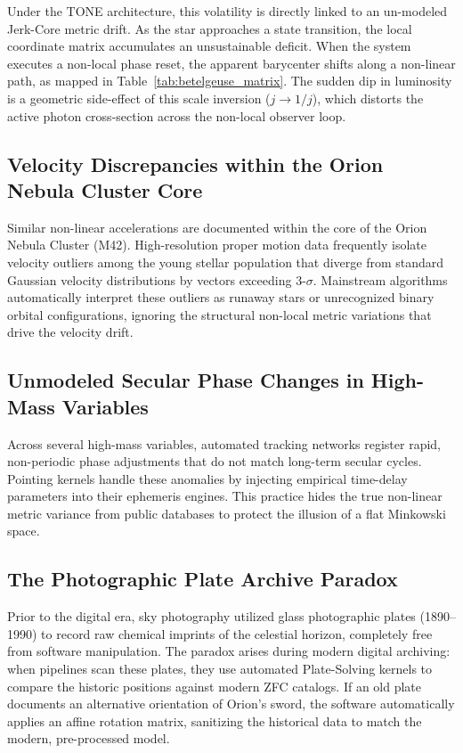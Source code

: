 \documentclass[11pt,a4paper]{article}
\theoremstyle{plain}
\theoremstyle{definition}
\begin{document}
Under the TONE architecture, this volatility is directly linked to an un-modeled Jerk-Core metric drift. As the star approaches a state transition, the local coordinate matrix accumulates an unsustainable deficit. When the system executes a non-local phase reset, the apparent barycenter shifts along a non-linear path, as mapped in Table~\ref{tab:betelgeuse_matrix}. The sudden dip in luminosity is a geometric side-effect of this scale inversion ($j \to 1/j$), which distorts the active photon cross-section across the non-local observer loop.
\subsection{Velocity Discrepancies within the Orion Nebula Cluster Core}
Similar non-linear accelerations are documented within the core of the Orion Nebula Cluster (M42). High-resolution proper motion data frequently isolate velocity outliers among the young stellar population that diverge from standard Gaussian velocity distributions by vectors exceeding $3\text{-}\sigma$. Mainstream algorithms automatically interpret these outliers as runaway stars or unrecognized binary orbital configurations, ignoring the structural non-local metric variations that drive the velocity drift.
\subsection{Unmodeled Secular Phase Changes in High-Mass Variables}
Across several high-mass variables, automated tracking networks register rapid, non-periodic phase adjustments that do not match long-term secular cycles. Pointing kernels handle these anomalies by injecting empirical time-delay parameters into their ephemeris engines. This practice hides the true non-linear metric variance from public databases to protect the illusion of a flat Minkowski space.
\subsection{The Photographic Plate Archive Paradox}
Prior to the digital era, sky photography utilized glass photographic plates (1890--1990) to record raw chemical imprints of the celestial horizon, completely free from software manipulation. The paradox arises during modern digital archiving: when pipelines scan these plates, they use automated Plate-Solving kernels to compare the historic positions against modern ZFC catalogs. If an old plate documents an alternative orientation of Orion's sword, the software automatically applies an affine rotation matrix, sanitizing the historical data to match the modern, pre-processed model.
\end{document}
